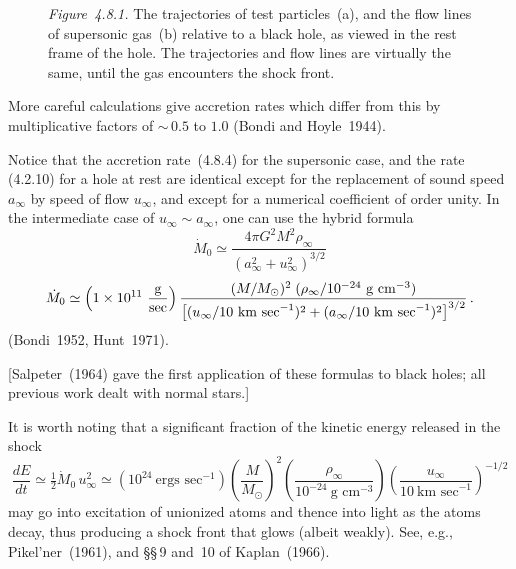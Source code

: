 \begin{figure}[htbp]
\centering
\caption{\textit{Figure~4.8.1.} The trajectories of test particles~(a), and the flow lines
of supersonic gas~(b) relative to a black hole, as viewed in the rest frame of the hole.
The trajectories and flow lines are virtually the same, until the gas encounters the
shock front.}
\label{fig:4.8.1}
\end{figure}

More careful calculations give accretion rates which differ from this by
multiplicative factors of ${\sim}\,0.5$ to $1.0$ (Bondi and Hoyle~1944).

Notice that the accretion rate~(4.8.4) for the supersonic case, and the rate
(4.2.10) for a hole at rest are identical except for the replacement of sound
speed $a_\infty$ by speed of flow $u_\infty$, and except for a numerical coefficient of order
unity. In the intermediate case of $u_\infty \sim a_\infty$, one can use the hybrid formula
%
\begin{equation}
\dot{M}_0 \simeq \frac{4\pi G^2 M^2 \rho_\infty}{(a_\infty^2 + u_\infty^2)^{3/2}}
\tag{4.8.5}
\end{equation}
%
\begin{equation}
\dot{M}_0 \simeq \left(1 \times 10^{11}~\frac{\text{g}}{\text{sec}}\right)
\frac{(M/M_\odot)^2\;(\rho_\infty/10^{-24}~\text{g~cm}^{-3})}
{\bigl[(u_\infty/10~\text{km~sec}^{-1})^2 + (a_\infty/10~\text{km~sec}^{-1})^2\bigr]^{3/2}}\,.
\notag
\end{equation}
%
(Bondi~1952, Hunt~1971).

[Salpeter~(1964) gave the first application of these formulas to black holes; all
previous work dealt with normal stars.]

It is worth noting that a significant fraction of the kinetic energy released in
the shock
%
\begin{equation}
\frac{dE}{dt} \simeq \tfrac{1}{2}\dot{M}_0\, u_\infty^2
\simeq \left(10^{24}~\text{ergs~sec}^{-1}\right)
\left(\frac{M}{M_\odot}\right)^{\!2}
\left(\frac{\rho_\infty}{10^{-24}~\text{g~cm}^{-3}}\right)
\left(\frac{u_\infty}{10~\text{km~sec}^{-1}}\right)^{-1/2}
\tag{4.8.6}
\end{equation}
%
may go into excitation of unionized atoms and thence into light as the atoms
decay, thus producing a shock front that glows (albeit weakly). See, e.g.,
Pikel'ner~(1961), and \S\S\,9 and~10 of Kaplan~(1966).

